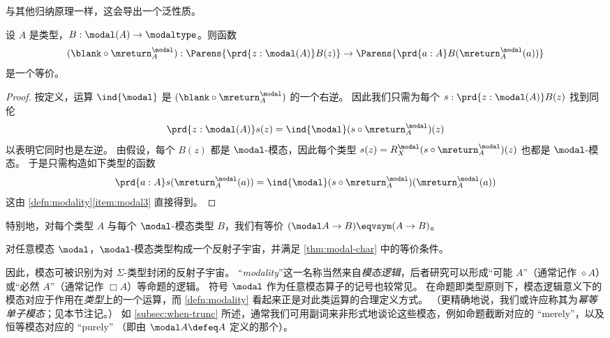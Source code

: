 %
与其他归纳原理一样，这会导出一个泛性质。

\begin{thm}\label{prop:lv_n_deptype_sec_equiv_by_precomp}
设 $A$ 是类型，$B:\modal(A)\to\modaltype$。则函数
\begin{equation*}
(\blank\circ \mreturn^\modal_A) : \Parens{\prd{z:\modal(A)}B(z)} \to \Parens{\prd{a:A}B(\mreturn^\modal_A(a))}
\end{equation*}
是一个等价。
\end{thm}
\begin{proof}
按定义，运算 $\ind{\modal}$ 是 $(\blank\circ \mreturn^\modal_A)$ 的一个右逆。
因此我们只需为每个 $s:\prd{z:\modal(A)}B(z)$ 找到同伦
\begin{equation*}
\prd{z:\modal(A)}s(z)= \ind{\modal}(s\circ \mreturn^\modal_A)(z)
\end{equation*}
以表明它同时也是左逆。
由假设，每个 $B(z)$ 都是 $\modal$-模态，因此每个类型 $s(z)= R^\modal_X(s\circ \mreturn^\modal_A)(z)$
也都是 $\modal$-模态。
于是只需构造如下类型的函数
\begin{equation*}
\prd{a:A}s(\mreturn^\modal_A(a))= \ind{\modal}(s\circ \mreturn^\modal_A)(\mreturn^\modal_A(a))
\end{equation*}
这由 \cref{defn:modality}\ref{item:modal3} 直接得到。
\end{proof}

特别地，对每个类型 $A$ 与每个 $\modal$-模态类型 $B$，我们有等价 $(\modal A\to B)\eqvsym (A\to B)$。

\begin{cor}
  对任意模态 $\modal$，$\modal$-模态类型构成一个反射子宇宙，并满足 \cref{thm:modal-char} 中的等价条件。
\end{cor}

因此，模态可被识别为对 $\Sigma$-类型封闭的反射子宇宙。
“\emph{modality}”这一名称当然来自\emph{模态逻辑}，后者研究可以形成“可能 $A$”（通常记作 $\diamond A$）或“必然 $A$”（通常记作 $\Box A$）等命题的逻辑。
符号 $\modal$ 作为任意模态算子的记号也较常见。 %
在命题即类型原则下，模态逻辑意义下的模态对应于作用在\emph{类型}上的一个运算，而 \cref{defn:modality} 看起来正是对此类运算的合理定义方式。
（更精确地说，我们或许应称其为\emph{幂等单子模态}；见本节注记。）
%
如 \cref{subsec:when-trunc} 所述，通常我们可用副词来非形式地谈论这些模态，例如命题截断对应的 ``merely''，以及恒等模态对应的 ``purely''
%
%
（即由 $\modal A \defeq A$ 定义的那个）。

